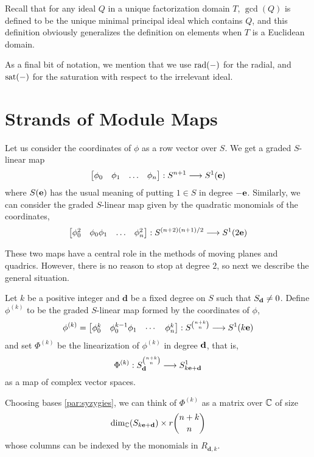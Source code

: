 \documentclass[fleqn,reqno]{amsart}
\begin{document}
\begin{paragraf}
Recall that for any ideal $Q$ in a unique factorization domain $T$,
$\gcd(Q)$ is defined to be the unique minimal principal ideal which contains $Q$,
and this definition obviously generalizes the definition on elements
when $T$ is a Euclidean domain.
\end{paragraf}

\begin{paragraf}
As a final bit of notation, we mention that we use $\operatorname{rad}(-)$ for the radial,
and $\operatorname{sat}(-)$ for the saturation with respect to the irrelevant ideal.
\end{paragraf}



\section{Strands of Module Maps}
\label{sec:strands}

\begin{paragraf}
\label{par:all-phi-k}
Let us consider the coordinates of $\phi$ as a row vector over $S$. We get a graded $S$-linear map
\[
\begin{bmatrix}
	\phi_0& \phi_1& \ldots& \phi_n
\end{bmatrix}:S^{n+1}\longrightarrow S^1(\mathbf e)
\]
where $S(\mathbf e)$ has the usual meaning of putting $1\in S$ in degree $-\mathbf e$.
Similarly, we can consider the graded $S$-linear map given by the quadratic monomials
of the coordinates,
\[
\begin{bmatrix}
	\phi_0^2& \phi_0\phi_1& \ldots& \phi_n^2
\end{bmatrix}:S^{(n+2)(n+1)/2}\longrightarrow S^1(2\mathbf e)
\]

These two maps have a central role in the methods of moving planes and quadrics.
However, there is no reason to stop at degree $2$,
so next we describe the general situation.
\end{paragraf}

\begin{paragraf}
\label{par:strands}
Let $k$ be a positive integer and $\mathbf d$ be a fixed degree on $S$ such that $S_\mathbf d\neq0$.
Define $\phi^{(k)}$ to be the graded $S$-linear map formed by the coordinates of $\phi$,
\[
\phi^{(k)}=\begin{bmatrix}\phi_0^k& \phi_0^{k-1}\phi_1& \cdots& \phi_n^k\end{bmatrix}:
S^{\binom{n+k}{n}}\longrightarrow S^1(k\mathbf e)
\]
and set $\Phi^{(k)}$ be the linearization of $\phi^{(k)}$ in degree $\mathbf d$, that is,
\[
\Phi^{(k)}:S_{\mathbf d}^{\binom{n+k}{n}}\longrightarrow S_{k\mathbf e+\mathbf d}^1
\]
as a map of complex vector spaces.

Choosing bases \eqref{par:syzygies}, we can think of $\Phi^{(k)}$ as a matrix over $\mathbb{C}$ of size
\[
\dim_{\mathbb{C}}(S_{k\mathbf e+\mathbf d})\times r\binom{n+k}{n}
\]
whose columns can be indexed by the monomials in $R_{\mathbf d,k}$.
\end{paragraf}
\end{document}

